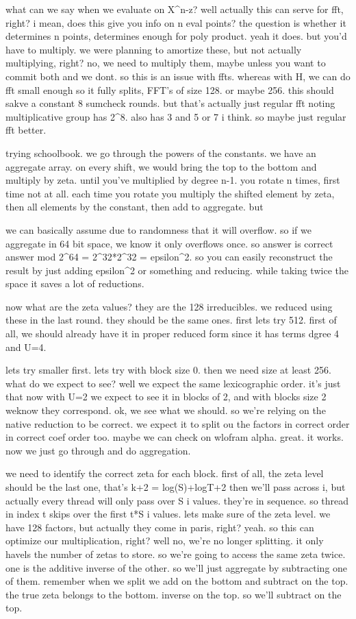 what can we say when we evaluate on X^n-z? well actually this can serve for fft, right? i mean, does this give you info on n eval points? the question is whether it determines n points, determines enough for poly product. yeah it does. but you'd have to multiply. we were planning to amortize these, but not actually multiplying, right? no, we need to multiply them, maybe unless you want to commit both and we dont. so this is an issue with ffts. whereas with H, we can do fft small enough so it fully splits, FFT's of size 128. or maybe 256. this should sakve a constant 8 sumcheck rounds. but that's actually just regular fft noting multiplicative group has 2^8. also has 3 and 5 or 7 i think. so maybe just regular fft better. 




trying schoolbook. 
we go through the powers of the constants. we have an aggregate array.
on every shift, we would bring the top to the bottom and multiply by zeta. until you've multiplied by degree n-1. 
you rotate n times, first time not at all. 
each time you rotate you multiply the shifted element by zeta, then all elements by the constant, then add to aggregate. but 

we can basically assume due to randomness that it will overflow. so if we aggregate in 64 bit space, we know it only overflows once. so answer is correct answer mod 2^64 = 2^32*2^32 = epsilon^2. so you can easily reconstruct the result by just adding epsilon^2 or something and reducing. while taking twice the space it saves a lot of reductions. 

now what are the zeta values?
they are the 128 irreducibles. we reduced using these in the last round. they should be the same ones. 
first lets try 512. 
first of all, we should already have it in proper reduced form since it has terms dgree 4 and U=4.

lets try smaller first. lets try with block size 0. then we need size  at least 256. 
what do we expect to see? well we expect the same lexicographic order. it's just that now with U=2 we expect to see it in blocks of 2, and with blocks size 2 weknow they correspond. ok, we see what we should. 
so we're relying on the native reduction to be correct. we expect it to split ou the factors in correct order in correct coef order too. maybe we can check on wlofram alpha. great. it works. 
now we just go through and do aggregation. 

we need to identify the correct zeta for each block. 
first of all, the zeta level should be the last one, that's k+2 = log(S)+logT+2
then we'll pass across i, but actually every thread will only pass over S i values. they're in sequence. so thread in index t skips over the first t*S i values.
lets make sure of the zeta level. we have 128 factors, but actually they come in paris, right? yeah. so this can optimize our multiplication, right?
well no, we're no longer splitting. it only havels the number of zetas to store. so we're going to access the same zeta twice. one is the additive inverse of the other. so we'll just aggregate by subtracting one of them.
remember when we split we add on the bottom and subtract on the top. the true zeta belongs to the bottom. inverse on the top. so we'll subtract on the top. 

